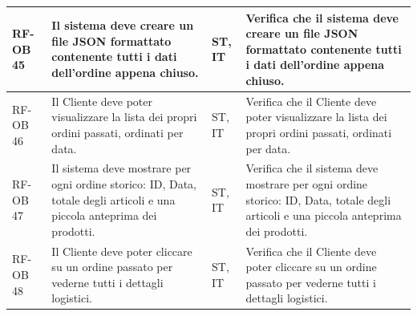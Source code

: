 \documentclass[a4paper,11pt,oneside]{scrartcl}
\begin{document}
\begin{longtable}{|p{1.5cm}|p{4.5cm}|p{1.8cm}|p{6cm}|}
    RF-OB 45         & Il sistema deve creare un file JSON formattato contenente tutti i dati dell'ordine appena chiuso.                                                                                                                                                                                                     & ST, IT             & Verifica che il sistema deve creare un file JSON formattato contenente tutti i dati dell'ordine appena chiuso.                                                                                                                                                                                                     \\ \hline
    RF-OB 46         & Il Cliente deve poter visualizzare la lista dei propri ordini passati, ordinati per data.                                                                                                                                                                                                             & ST, IT             & Verifica che il Cliente deve poter visualizzare la lista dei propri ordini passati, ordinati per data.                                                                                                                                                                                                             \\ \hline
    RF-OB 47         & Il sistema deve mostrare per ogni ordine storico: ID, Data, totale degli articoli e una piccola anteprima dei prodotti.                                                                                                                                                                               & ST, IT             & Verifica che il sistema deve mostrare per ogni ordine storico: ID, Data, totale degli articoli e una piccola anteprima dei prodotti.                                                                                                                                                                               \\ \hline
    RF-OB 48         & Il Cliente deve poter cliccare su un ordine passato per vederne tutti i dettagli logistici.                                                                                                                                                                                                           & ST, IT             & Verifica che il Cliente deve poter cliccare su un ordine passato per vederne tutti i dettagli logistici.                                                                                                                                                                                                           \\ \hline

\end{longtable}
\end{document}
